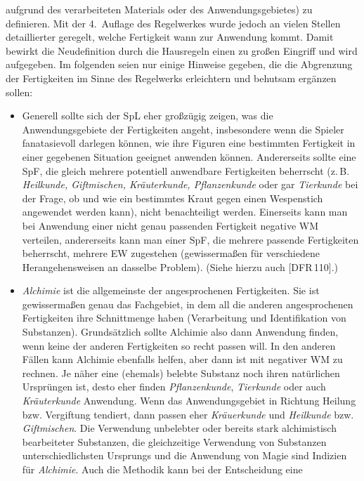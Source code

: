 \documentclass[10pt,a4paper,germanpar]{article}
\begin{document}
\begin{itemize}
  aufgrund des verarbeiteten Materials oder des Anwendungsgebietes) zu
  definieren. Mit der 4.~Auflage des Regelwerkes wurde jedoch an vielen
  Stellen detaillierter geregelt, welche Fertigkeit wann zur Anwendung kommt.
  Damit bewirkt die Neudefinition durch die Hausregeln einen zu großen
  Eingriff und wird aufgegeben. Im folgenden seien nur einige Hinweise
  gegeben, die die Abgrenzung der Fertigkeiten im Sinne des Regelwerks
  erleichtern und behutsam ergänzen sollen:
  \begin{itemize}
  \item Generell sollte sich der SpL eher großzügig zeigen, was die
    Anwendungsgebiete der Fertigkeiten angeht, insbesondere wenn die Spieler
    fanatasievoll darlegen können, wie ihre Figuren eine bestimmten Fertigkeit
    in einer gegebenen Situation geeignet anwenden können. Andererseits sollte
    eine SpF, die gleich mehrere potentiell anwendbare Fertigkeiten beherrscht
    (z.\,B. \emph{Heilkunde, Giftmischen, Kräuterkunde, Pflanzenkunde} oder gar
    \emph{Tierkunde} bei der Frage, ob und wie ein bestimmtes Kraut gegen
    einen Wespenstich angewendet werden kann), nicht benachteiligt werden.
    Einerseits kann man bei Anwendung einer nicht genau passenden Fertigkeit
    negative WM verteilen, andererseits kann man einer SpF, die mehrere
    passende Fertigkeiten beherrscht, mehrere EW zugestehen (gewissermaßen für
    verschiedene Herangehensweisen an dasselbe Problem). (Siehe hierzu
    auch [DFR\,110].)
  \item \emph{Alchimie} ist die allgemeinste der angesprochenen Fertigkeiten.
    Sie ist gewissermaßen genau das Fachgebiet, in dem all die anderen
    angesprochenen Fertigkeiten ihre Schnittmenge haben (Verarbeitung und
    Identifikation von Substanzen). Grundsätzlich sollte Alchimie also dann
    Anwendung finden, wenn keine der anderen Fertigkeiten so recht passen
    will. In den anderen Fällen kann Alchimie ebenfalls helfen, aber dann ist
    mit negativer WM zu rechnen. Je näher eine (ehemals) belebte Substanz noch
    ihren natürlichen Ursprüngen ist, desto eher finden \emph{Pflanzenkunde},
    \emph{Tierkunde} oder auch \emph{Kräuterkunde} Anwendung. Wenn das
    Anwendungsgebiet in Richtung Heilung bzw. Vergiftung tendiert, dann passen
    eher \emph{Kräuerkunde} und \emph{Heilkunde} bzw. \emph{Giftmischen}. Die
    Verwendung unbelebter oder bereits stark alchimistisch bearbeiteter
    Substanzen, die gleichzeitige Verwendung von Substanzen
    unterschiedlichsten Ursprungs und die Anwendung von Magie sind Indizien
    für \emph{Alchimie}. Auch die Methodik kann bei der Entscheidung eine

\end{itemize}
\end{itemize}
\end{document}
